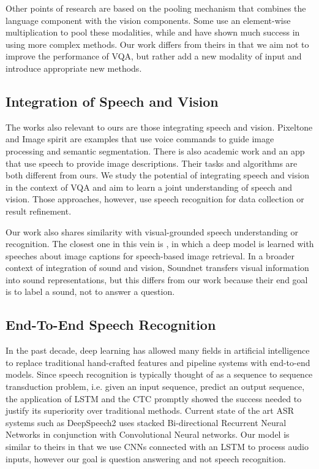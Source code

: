 \documentclass[letterpaper]{article} %
\begin{document}
Other points of research are based on the pooling mechanism that combines the language component with the vision components. Some use an element-wise multiplication \cite{vqa:spatial:attn,vqa:stackedattn} to pool these modalities, while \cite{vqa:hieco} and \cite{multimodal:pooling} have shown much success in using more complex methods. Our work differs from theirs in that we aim not to improve the performance of VQA, but rather add a new modality of input and introduce appropriate new methods.


\subsection{Integration of Speech and Vision}
The works also relevant to ours are those integrating speech and vision. Pixeltone \cite{pixel:tone}
and Image spirit \cite{image:spirit} are examples that use voice
commands to guide image processing and semantic segmentation. There is also academic work \cite{show:tell,speech:anno:img,speech:retri:img} and an app \cite{smile} that use speech to provide image descriptions. Their tasks and algorithms are both different from ours. We study the potential of integrating speech and vision in the context of VQA and aim to learn a joint understanding of speech and vision. Those approaches, however, use speech recognition for data collection or result refinement.

Our work also shares similarity with visual-grounded speech understanding or recognition. The closest one in this vein is \cite{speech:caption}, in which a deep model is learned with speeches about image captions for speech-based image retrieval. In a broader context of integration of sound and vision, Soundnet \cite{soundnet} transfers visual information into sound representations, but this differs from our work because their end goal is to label a sound, not to answer a question.

\subsection{End-To-End Speech Recognition}
In the past decade, deep learning has allowed many fields in artificial intelligence to replace traditional hand-crafted features and pipeline systems with end-to-end models. Since speech recognition is typically thought of as a sequence to sequence transduction problem, i.e. given an input sequence, predict an output sequence, the application of LSTM and the CTC \cite{rnn:discrimspotting,ctc} promptly showed the success needed to justify its superiority over traditional methods. Current state of the art ASR systems such as DeepSpeech2 \cite{deepspeech2} uses stacked Bi-directional Recurrent Neural Networks in conjunction with Convolutional Neural networks. Our model is similar to theirs in that we use CNNs connected with an LSTM to process audio inputs, however our goal is question answering and not speech recognition.
\end{document}
